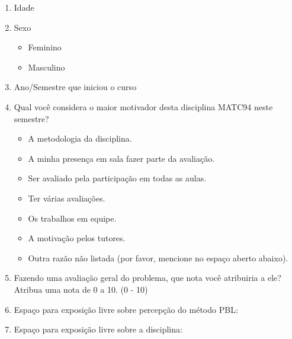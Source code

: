 \acresetall
\label{form-disciplina-concluinte}
\begin{enumerate}
\item{Idade}
\item{Sexo}
\begin{itemize}
	\item{Feminino}
	\item{Masculino}
\end{itemize}
\item{Ano/Semestre que iniciou o curso}
\AfirmacaoLikert{\LikertCA{}}
\AfirmacaoLikert{\LikertCB{}}
\AfirmacaoLikert{\LikertCC{}}
\AfirmacaoLikert{\LikertCD{}}
\AfirmacaoLikert{\LikertCE{}}
\AfirmacaoLikert{\LikertCF{}}
\AfirmacaoLikert{\LikertCG{}}
\item{Qual você considera o maior motivador desta disciplina MATC94 neste semestre?}
\begin{itemize}
\item{A metodologia da disciplina.}
\item{A minha presença em sala fazer parte da avaliação.}
\item{Ser avaliado pela participação em todas as aulas.}
\item{Ter várias avaliações.}
\item{Os trabalhos em equipe.}
\item{A motivação pelos tutores.}
\item{Outra razão não listada (por favor, mencione no espaço aberto abaixo).}
\end{itemize}
\AfirmacaoLikert{\LikertCH{}}
\AfirmacaoLikert{\LikertCI{}}
\AfirmacaoLikert{\LikertCJ{}}
\AfirmacaoLikert{\LikertCK{}}
\AfirmacaoLikert{\LikertCL{}}
\AfirmacaoLikert{\LikertCM{}}
\AfirmacaoLikert{\LikertCN{}}
\item{Fazendo uma avaliação geral do problema, que nota você
atribuiria a ele? Atribua uma nota de 0 a 10. (0 - 10)}
\item{Espaço para exposição livre sobre percepção do método PBL:}
\item{Espaço para exposição livre sobre a disciplina:}
\end{enumerate}
